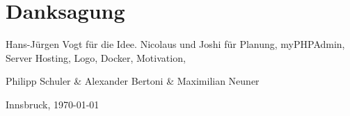 \section*{Danksagung}

Hans-Jürgen Vogt für die Idee.
Nicolaus und Joshi für Planung, myPHPAdmin, Server Hosting, Logo, Docker, Motivation, 
\vspace{1cm}

Philipp Schuler \& Alexander Bertoni \& Maximilian Neuner

Innsbruck, \today

\newpage